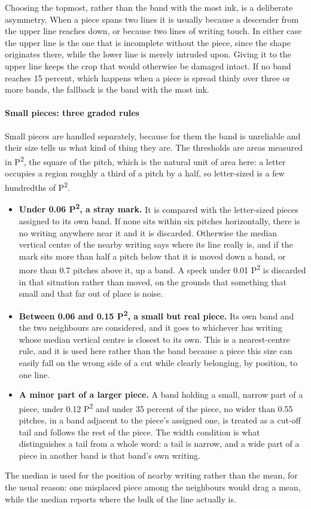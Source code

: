 Choosing the topmost, rather than the band with the most ink, is a deliberate asymmetry. When a piece spans two lines it is usually because a descender from the upper line reaches down, or because two lines of writing touch. In either case the upper line is the one that is incomplete without the piece, since the shape originates there, while the lower line is merely intruded upon. Giving it to the upper line keeps the crop that would otherwise be damaged intact. If no band reaches 15 percent, which happens when a piece is spread thinly over three or more bands, the fallback is the band with the most ink.


\paragraph{Small pieces: three graded rules}
Small pieces are handled separately, because for them the band is unreliable and their size tells us what kind of thing they are. The thresholds are areas measured in P\textsuperscript{2}, the square of the pitch, which is the natural unit of area here: a letter occupies a region roughly a third of a pitch by a half, so letter-sized is a few hundredths of P\textsuperscript{2}.


\begin{itemize}\setlength\itemsep{0pt}
  \item \textbf{Under 0.06 P\textsuperscript{2}, a stray mark.} It is compared with the letter-sized pieces assigned to its own band. If none sits within six pitches horizontally, there is no writing anywhere near it and it is discarded. Otherwise the median vertical centre of the nearby writing says where its line really is, and if the mark sits more than half a pitch below that it is moved down a band, or more than 0.7 pitches above it, up a band. A speck under 0.01 P\textsuperscript{2} is discarded in that situation rather than moved, on the grounds that something that small and that far out of place is noise.
  \item \textbf{Between 0.06 and 0.15 P\textsuperscript{2}, a small but real piece.} Its own band and the two neighbours are considered, and it goes to whichever has writing whose median vertical centre is closest to its own. This is a nearest-centre rule, and it is used here rather than the band because a piece this size can easily fall on the wrong side of a cut while clearly belonging, by position, to one line.
  \item \textbf{A minor part of a larger piece.} A band holding a small, narrow part of a piece, under 0.12 P\textsuperscript{2} and under 35 percent of the piece, no wider than 0.55 pitches, in a band adjacent to the piece's assigned one, is treated as a cut-off tail and follows the rest of the piece. The width condition is what distinguishes a tail from a whole word: a tail is narrow, and a wide part of a piece in another band is that band's own writing.
\end{itemize}
The median is used for the position of nearby writing rather than the mean, for the usual reason: one misplaced piece among the neighbours would drag a mean, while the median reports where the bulk of the line actually is.


